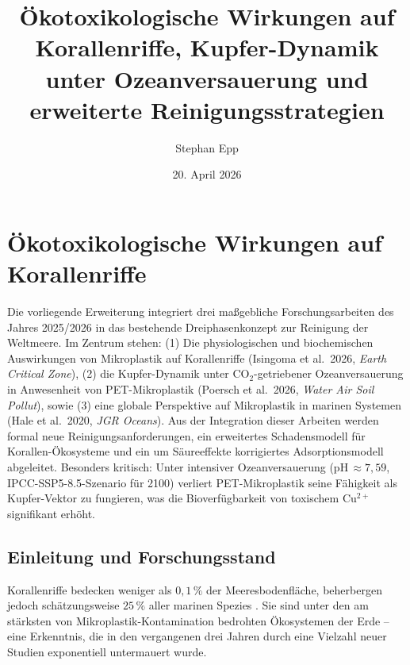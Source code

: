 ﻿\documentclass[12pt,a4paper]{article}
\title{Ökotoxikologische Wirkungen auf Korallenriffe, Kupfer-Dynamik unter Ozeanversauerung und erweiterte Reinigungsstrategien}
\author{Stephan Epp}
\date{20. April 2026}
\theoremstyle{definition}
\theoremstyle{remark}
\newcommand{\MP}{Mikroplastik}
\begin{document}
\maketitle
\tableofcontents
\newpage

\section{Ökotoxikologische Wirkungen auf Korallenriffe}
\label{sec:korallen_oekotox}

Die vorliegende Erweiterung integriert drei maßgebliche Forschungsarbeiten des
Jahres 2025/2026 in das bestehende Dreiphasenkonzept zur Reinigung der Weltmeere.
Im Zentrum stehen: (1) Die physiologischen und biochemischen Auswirkungen von
\MP{} auf Korallenriffe (Isingoma et al.\ 2026, \textit{Earth Critical Zone}),
(2) die Kupfer-Dynamik unter CO$_2$-getriebener Ozeanversauerung in Anwesenheit von
PET-Mikroplastik (Poersch et al.\ 2026, \textit{Water Air Soil Pollut}), sowie
(3) eine globale Perspektive auf \MP{} in marinen Systemen (Hale et al.\ 2020,
\textit{JGR Oceans}). Aus der Integration dieser Arbeiten werden formal neue
Reinigungsanforderungen, ein erweitertes Schadensmodell für Korallen-Ökosysteme
und ein um Säureeffekte korrigiertes Adsorptionsmodell abgeleitet.
Besonders kritisch: Unter intensiver Ozeanversauerung (pH\,$\approx 7{,}59$,
IPCC-SSP5-8.5-Szenario für 2100) verliert PET-Mikroplastik seine Fähigkeit als
Kupfer-Vektor zu fungieren, was die Bioverfügbarkeit von toxischem Cu$^{2+}$
signifikant erhöht.

\subsection{Einleitung und Forschungsstand}

Korallenriffe bedecken weniger als $0{,}1\,\%$ der Meeresbodenfl\"ache, beherbergen
jedoch schätzungsweise $25\,\%$ aller marinen Spezies
\cite{plaisance2011diversity}. Sie sind unter den am stärksten von \MP{}-Kontamination
bedrohten Ökosystemen der Erde -- eine Erkenntnis, die in den vergangenen drei
Jahren durch eine Vielzahl neuer Studien exponentiell untermauert wurde.
\end{document}
